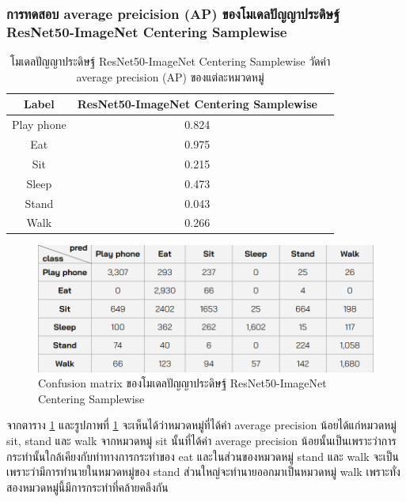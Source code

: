 \subsubsection{การทดสอบ average preicision (AP) ของโมเดลปัญญาประดิษฐ์ ResNet50-ImageNet Centering Samplewise}
\begin{table}[!ht]
	\centering
	\begin{tabular}{|c|c|c|}
			\hline
			{Label}&{ResNet50-ImageNet Centering Samplewise}			\\
			\hline
			Play phone				& 0.824			\\
			Eat						& 0.975			\\
			Sit						& 0.215			\\
			Sleep					& 0.473			\\
			Stand					& 0.043			\\
			Walk					& 0.266			\\
			\hline
	\end{tabular}
\caption{โมเดลปัญญาประดิษฐ์ ResNet50-ImageNet	 Centering Samplewise วัดค่า average precision (AP) ของแต่ละหมวดหมู่}
\label{tab: ResNet50-ImageNet Centering Samplewise average precision}
\end{table}

\begin{figure}[!ht]
  \centering
    \includegraphics[scale=0.5]{chapter4/images/confusion_matrix.png}
    \caption{Confusion matrix ของโมเดลปัญญาประดิษฐ์  ResNet50-ImageNet Centering Samplewise}
    \label{fig:Confusion matrix of ResNet50-ImageNet Centering Samplewise model}
\end{figure}

จากตาราง \ref{tab: ResNet50-ImageNet Centering Samplewise average precision} และรูปภาพที่ \ref{fig:Confusion matrix of ResNet50-ImageNet Centering Samplewise model} จะเห็นได้ว่าหมวดหมู่ที่ได้ค่า average precision น้อยได้แก่หมวดหมู่ sit, stand และ walk จากหมวดหมู่ sit นั้นที่ได้ค่า  average precision น้อยนั้นเป็นเพราะว่าการกระทำนั้นใกล้เคียงกับท่าทางการกระทำของ eat และในส่วนของหมวดหมู่ stand และ walk จะเป็นเพราะว่ามีการทำนายในหมวดหมู่ของ stand ส่วนใหญ่จะทำนายออกมาเป็นหมวดหมู่ walk เพราะทั่งสองหมวดหมู่นี้มีการกระทำที่คล้ายคลึงกัน

